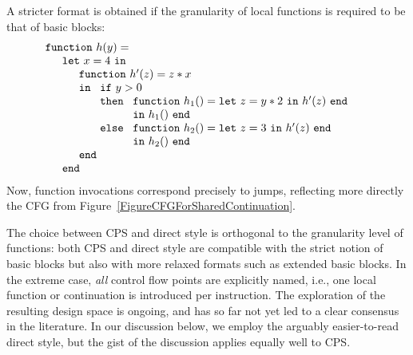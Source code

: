 A stricter format is obtained if the granularity of local functions is
required to be that of basic blocks:
\begin{equation}
\label{DirectStyleCode2}
\begin{array}{l}
\mathtt{function}\ h (y) =\\
\quad
  \begin{array}{l}
    \mathtt{let}\ x=4\ \mathtt{in} \\
    \quad \begin{array}{l}
            \mathtt{function}\ h' (z) = z*x \\
            \mathtt{in}\
                \begin{array}[t]{l}
                  \mathtt{if}\ y>0\\
                  \mathtt{then}\ 
                     \begin{array}[t]{l}
                        \mathtt{function}\ h_1 () = \mathtt{let}\
                              z = y*2\ \mathtt{in}\ h'(z)\ \mathtt{end}\\
                        \mathtt{in}\ h_1()\ \mathtt{end}
                     \end{array}\\
                  \mathtt{else}\ 
                     \begin{array}[t]{l}
                        \mathtt{function}\ h_2 () = \mathtt{let}\
                              z = 3\ \mathtt{in}\ h'(z)\ \mathtt{end}\\
                        \mathtt{in}\ h_2()\ \mathtt{end}
                     \end{array}
                \end{array}\\
            \mathtt{end}
          \end{array} \\
    \mathtt{end}
  \end{array}
\end{array}
\end{equation} 
Now, function invocations correspond precisely to jumps, reflecting
more directly the CFG from
Figure~\ref{FigureCFGForSharedContinuation}.  

The choice between CPS and direct style is orthogonal to the
granularity level of functions: both CPS and direct style are
compatible with the strict notion of basic blocks but also with more
relaxed formats such as extended basic blocks. In the extreme case,
\emph{all} control flow points are explicitly named, i.e., one local
function or continuation is introduced per instruction. The
exploration of the resulting design space is ongoing, and has so far
not yet led to a clear consensus in the literature. In our discussion
below, we employ the arguably easier-to-read direct style, but the
gist of the discussion applies equally well to CPS.

